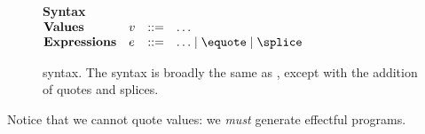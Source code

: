 \begin{figure}
\begin{source-desc}
  {\large \textbf{Syntax}} \\

  $\begin{array}{@{}llll}
    \textbf{Values} & v & ::= & \ldots \\
    \textbf{Expressions} & e & ::= & \ldots \mid \equote \mid \splice
  \end{array}$
\end{source-desc}
\caption{\sourceLang{} syntax. The syntax is broadly the same as \efflang{}, except with the addition of quotes and splices.}
\label{fig:source-syntax}
\end{figure}

Notice that we cannot quote values: we \textit{must} generate effectful programs.
